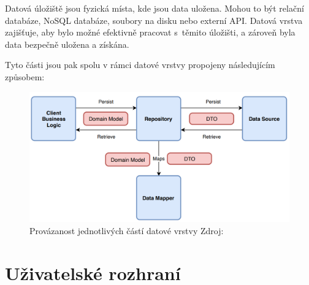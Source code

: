 Datová úložiště jsou fyzická místa, kde jsou data uložena. Mohou to být relační databáze, NoSQL databáze, soubory na disku nebo externí API. 
Datová vrstva zajišťuje, aby bylo možné efektivně pracovat s~těmito úložišti, a zároveň byla data bezpečně uložena a získána.

\bigskip

Tyto části jsou pak spolu v rámci datové vrstvy propojeny následujícím způsobem:

\begin{figure}[H]
  \centering
  \includegraphics[width=.8\textwidth]{arch_diagram.png}
  \caption{Provázanost jednotlivých částí datové vrstvy Zdroj: \cite{imgDataDiagram}}
  \label{fig:arch_diagram}
\end{figure}

\bigskip







\section{Uživatelské rozhraní}

